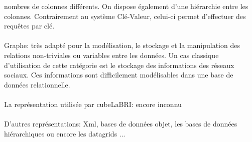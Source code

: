 nombres de colonnes différents. On dispose également d'une hiérarchie
entre les colonnes. Contrairement au système Clé-Valeur, celui-ci
permet d’effectuer des requêtes par clé.  \\\\ {\sf
  Graphe}: très adapté pour la modélisation, le
stockage et la manipulation des relations non-triviales ou variables
entre les données. Un cas classique d'utilisation de cette catégorie
est le stockage des informations des réseaux sociaux. Ces informations
sont difficilement modélisables dans une base de données
relationnelle.  \\ \\ {\color{red} {\sf La représentation utilisée par
    cubeLaBRI}: encore inconnu} \\ \\ \textsf{D'autres
  représentations}: \textsf{Xml}, \textsf{bases de données objet},
\textsf{les bases de données hiérarchiques ou encore les datagrids}
...
